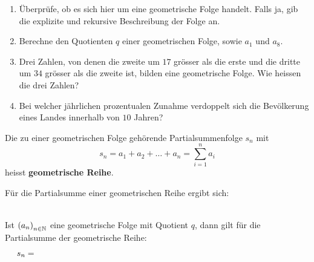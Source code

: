 \documentclass[11pt,oneside]{article}
\begin{document}
	\begin{aufgabe}
		\begin{enumerate}
			\item Überprüfe, ob es sich hier um eine geometrische Folge handelt. Falls ja, gib die explizite und rekursive Beschreibung der Folge an. %
			\item Berechne den Quotienten $q$ einer geometrischen Folge, sowie $a_1$ und $a_8$. %
			\item Drei Zahlen, von denen die zweite um $17$ grösser als die erste und die dritte um $34$ grösser als die zweite ist, bilden eine geometrische Folge. Wie heissen die drei Zahlen? %
			\item Bei welcher jährlichen prozentualen Zunahme verdoppelt sich die Bevölkerung eines Landes innerhalb von $10$ Jahren? %
		\end{enumerate}
	\end{aufgabe}
	\begin{definition}
		Die zu einer geometrischen Folge gehörende Partialsummenfolge $s_n$ mit \[s_n=a_1+a_2+\ldots+a_n=\sum_{i=1}^n a_i\] heisst \textbf{geometrische Reihe}.
	\end{definition}
	Für die Partialsumme einer geometrischen Reihe ergibt sich:\vspace{5pt}\\\\
	\begin{satz}
		Ist $\left(a_n\right)_{n\in\mathbb{N}}$ eine geometrische Folge mit Quotient $q$, dann gilt für die Partialsumme der geometrische Reihe: \[s_n=\hspace*{11cm}\]
	\end{satz}
\end{document}
